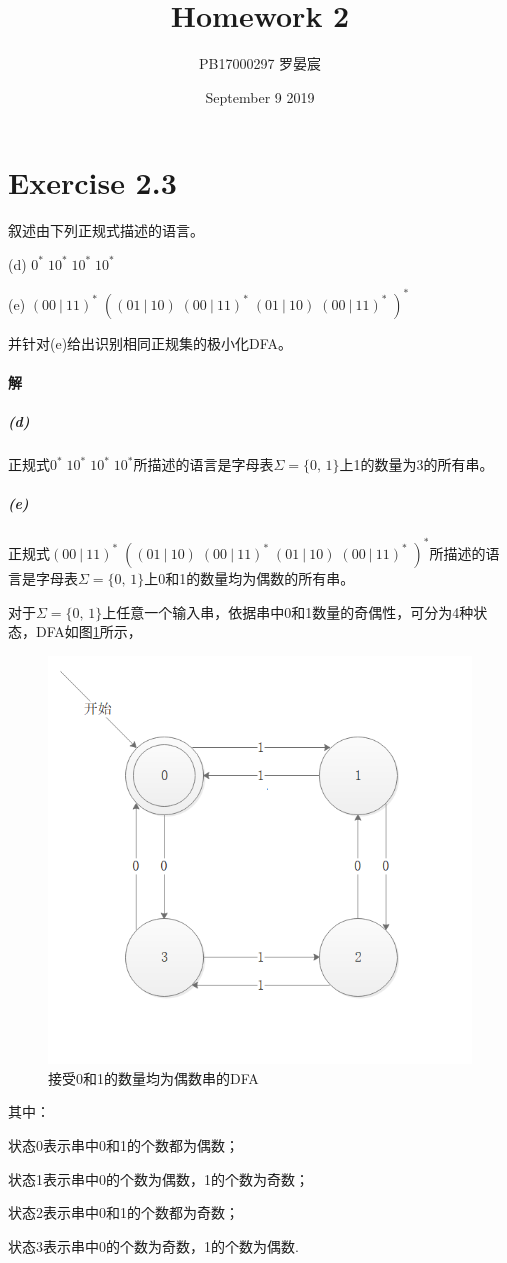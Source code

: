 \documentclass{article}
\title{Homework 2}
\author{PB17000297 罗晏宸}
\date{September 9 2019}
\begin{document}
\maketitle

\section{Exercise 2.3}
叙述由下列正规式描述的语言。\par
(d) $0^*\;10^*\;10^*\;10^*$\par
(e) $(00\ |\ 11)^*\;((01\ |\ 10)\;(00\ |\ 11)^*\;(01\ |\ 10)\;(00\ |\ 11)^*\;)^*$\par
并针对(e)给出识别相同正规集的极小化DFA。
\\

\paragraph{解}
\subparagraph{(d)}
正规式$0^*\;10^*\;10^*\;10^*$所描述的语言是字母表$\Sigma=\{0,\,1\}$上1的数量为3的所有串。
\subparagraph{(e)}
正规式$(00\ |\ 11)^*\;((01\ |\ 10)\;(00\ |\ 11)^*\;(01\ |\ 10)\;(00\ |\ 11)^*\;)^*$所描述的语言是字母表$\Sigma=\{0,\,1\}$上0和1的数量均为偶数的所有串。\par
对于$\Sigma=\{0,\,1\}$上任意一个输入串，依据串中0和1数量的奇偶性，可分为4种状态，DFA如图\ref{fig:1}所示，
\begin{figure}
\centering
\includegraphics[scale=1]{DFA1.png}
\caption{接受0和1的数量均为偶数串的DFA}
\label{fig:1}
\end{figure}
其中：\par
状态0表示串中0和1的个数都为偶数；\par
状态1表示串中0的个数为偶数，1的个数为奇数；\par
状态2表示串中0和1的个数都为奇数；\par
状态3表示串中0的个数为奇数，1的个数为偶数.
\\
\end{document}

